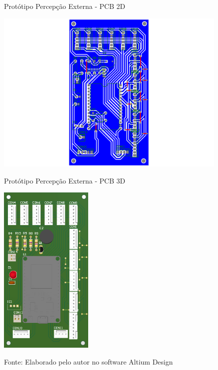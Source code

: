 \documentclass[../delivery_hospital_report.tex]{subfiles}
\begin{document}
\begin{figure}[!ht]
    \centering
    \begin{minipage}{0.5\textwidth}
        \centering
        \caption{Protótipo Percepção Externa - PCB 2D}
        \includegraphics[width=1.03\textwidth]{modulos/Percepção_Externa-3.png} 
        \label{fig:figura1minipg}
    \end{minipage}\hfill
    \begin{minipage}{0.5\textwidth}
        \centering
        \caption{Protótipo Percepção Externa - PCB 3D }
        \includegraphics[width=0.4\textwidth]{modulos/Percepção_Externa.png} 
        \label{fig:figura1minipg}
    \end{minipage}\hfill
    
    \caption*{Fonte: Elaborado pelo autor no software Altium Design\cite{altium21} }
    \label{fig:figurasminipg}
\end{figure}
\end{document}
